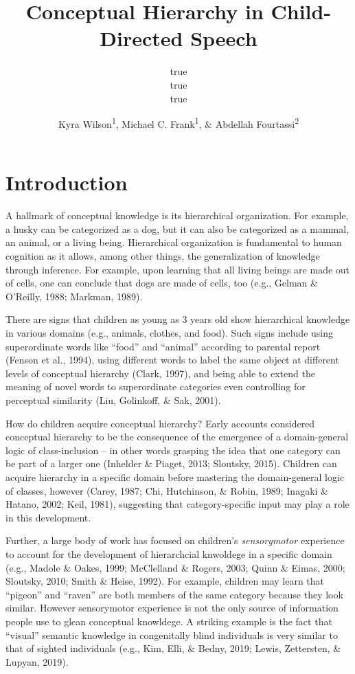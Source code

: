 \documentclass[english,,man,floatsintext]{apa6}
\title{Conceptual Hierarchy in Child-Directed Speech}
\author{true \\ true \\ true}
\date{}
\author{Kyra Wilson\textsuperscript{1}, Michael C. Frank\textsuperscript{1}, \& Abdellah Fourtassi\textsuperscript{2}}
\affiliation{
\vspace{0.5cm}
\textsuperscript{1} Department of Psychology, Stanford University\\\textsuperscript{2} Department of Computer Science, Aix-Marseille University}
\begin{document}
\maketitle

\hypertarget{introduction}{%
\section{Introduction}\label{introduction}}

A hallmark of conceptual knowledge is its hierarchical organization. For example, a husky can be categorized as a dog, but it can also be categorized as a mammal, an animal, or a living being. Hierarchical organization is fundamental to human cognition as it allows, among other things, the generalization of knowledge through inference. For example, upon learning that all living beings are made out of cells, one can conclude that dogs are made of cells, too (e.g., Gelman \& O'Reilly, 1988; Markman, 1989).

There are signs that children as young as 3 years old show hierarchical knowledge in various domains (e.g., animals, clothes, and food). Such signs include using superordinate words like \enquote{food} and \enquote{animal} according to parental report (Fenson et al., 1994), using different words to label the same object at different levels of conceptual hierarchy (Clark, 1997), and being able to extend the meaning of novel words to superordinate categories even controlling for perceptual similarity (Liu, Golinkoff, \& Sak, 2001).

How do children acquire conceptual hierarchy? Early accounts considered
conceptual hierarchy to be the consequence of the emergence of a
domain-general logic of class-inclusion -- in other words grasping the idea that one category can be part of a larger one (Inhelder \& Piaget, 2013; Sloutsky, 2015). Children can acquire hierarchy in a specific domain before mastering the domain-general logic of classes, however (Carey, 1987; Chi, Hutchinson, \& Robin, 1989; Inagaki \& Hatano, 2002; Keil, 1981), suggesting that category-specific input may play a role in this development.

Further, a large body of work has focused on children's \emph{sensorymotor} experience to account for the development of hierarchcial knwoldege in a specific domain (e.g., Madole \& Oakes, 1999; McClelland \& Rogers, 2003; Quinn \& Eimas, 2000; Sloutsky, 2010; Smith \& Heise, 1992). For example, children may learn that \enquote{pigeon} and \enquote{raven} are both members of the same category because they look similar. However sensorymotor experience is not the only source of information people use to glean conceptual knowldege. A striking example is the fact that \enquote{visual} semantic knowledge in congenitally blind individuals is very similar to that of sighted individuals (e.g., Kim, Elli, \& Bedny, 2019; Lewis, Zettersten, \& Lupyan, 2019).
\end{document}

